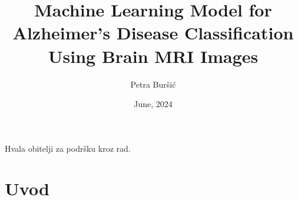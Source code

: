 \documentclass[zavrsnirad]{fer}
\title{Machine Learning Model for Alzheimer's Disease Classification Using Brain MRI Images}
\author{Petra Buršić}
\date{June, 2024}
\begin{document}
\maketitle






\begin{zahvale}
  Hvala obitelji za podršku kroz rad.
\end{zahvale}


\tableofcontents


\mainmatter


\chapter{Uvod}
\label{pog:uvod}
\end{document}

